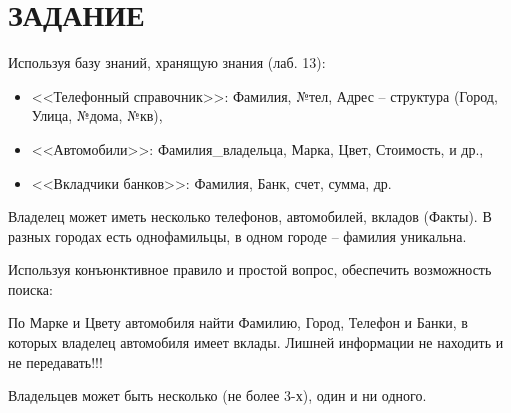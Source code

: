 \section{ЗАДАНИЕ}

Используя  базу знаний, хранящую знания (лаб. 13):

\begin{itemize}
    \item <<Телефонный справочник>>: Фамилия, №тел, Адрес – структура (Город, Улица, №дома, №кв),
    \item <<Автомобили>>: Фамилия\_владельца, Марка, Цвет, Стоимость, и др.,
    \item <<Вкладчики банков>>: Фамилия, Банк, счет, сумма, др.
\end{itemize}

Владелец может иметь несколько телефонов, автомобилей, вкладов (Факты). В разных городах есть однофамильцы, в одном городе – фамилия уникальна.

Используя конъюнктивное правило и простой вопрос, обеспечить возможность поиска:

По Марке и Цвету автомобиля найти Фамилию, Город, Телефон и Банки, в которых владелец автомобиля имеет вклады. Лишней информации не находить и не передавать!!!

Владельцев может быть несколько (не более 3-х), один и ни одного.

